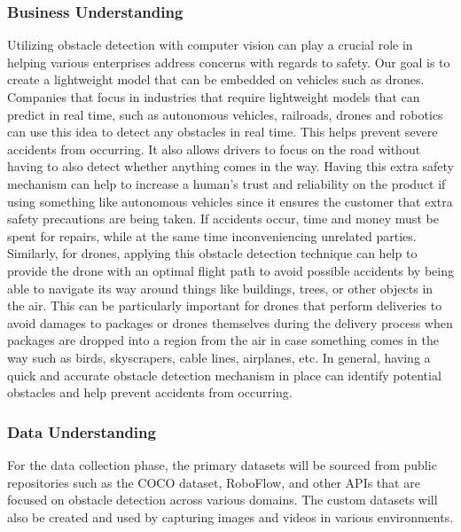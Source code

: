 \documentclass[stu,12pt,floatsintext]{apa7}
\begin{document}
\subsubsection{Business Understanding}
Utilizing obstacle detection with computer vision can play a crucial role in helping various enterprises address concerns with regards to safety. Our goal is to create a lightweight model that can be embedded on vehicles such as drones. Companies that focus in industries that require lightweight models that can predict in real time, such as autonomous vehicles, railroads, drones and robotics can use this idea to detect any obstacles in real time. This helps prevent severe accidents from occurring. It also allows drivers to focus on the road without having to also detect whether anything comes in the way. Having this extra safety mechanism can help to increase a human's trust and reliability on the product if using something like autonomous vehicles since it ensures the customer that extra safety precautions are being taken. If accidents occur, time and money must be spent for repairs, while at the same time inconveniencing unrelated parties. Similarly, for drones, applying this obstacle detection technique can help to provide the drone with an optimal flight path to avoid possible accidents by being able to navigate its way around things like buildings, trees, or other objects in the air. This can be particularly important for drones that perform deliveries to avoid damages to packages or drones themselves during the delivery process when packages are dropped into a region from the air in case something comes in the way such as birds, skyscrapers, cable lines, airplanes, etc. In general, having a quick and accurate obstacle detection mechanism in place can identify potential obstacles and help prevent accidents from occurring.


\subsubsection{Data Understanding}
For the data collection phase, the primary datasets will be sourced from public repositories such as the COCO dataset, RoboFlow, and other APIs that are focused on obstacle detection across various domains. The custom datasets will also be created and used by capturing images and videos in various environments.
\end{document}
